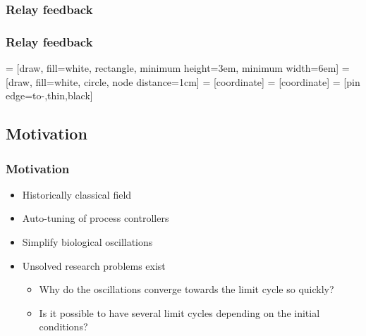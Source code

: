 \documentclass[11pt]{beamer}
\begin{document}
\subsubsection{Relay feedback}
\begin{frame}
\frametitle{Relay feedback}

 = [draw, fill=white, rectangle, 
    minimum height=3em, minimum width=6em]
 = [draw, fill=white, circle, node distance=1cm]
 = [coordinate]
 = [coordinate]
 = [pin edge={to-,thin,black}]

\begin{center}
\end{center}
\end{frame}

\subsection{Motivation}
\begin{frame}
\frametitle{Motivation}
\begin{itemize}
\item Historically classical field
\item Auto-tuning of process controllers
\item Simplify biological oscillations
\item Unsolved research problems exist
	\begin{itemize}
	\item Why do the oscillations converge towards the limit cycle so quickly?
	\item Is it possible to have several limit cycles depending on the initial conditions?
 \end{itemize}
\end{itemize}
\end{frame}
\end{document}

